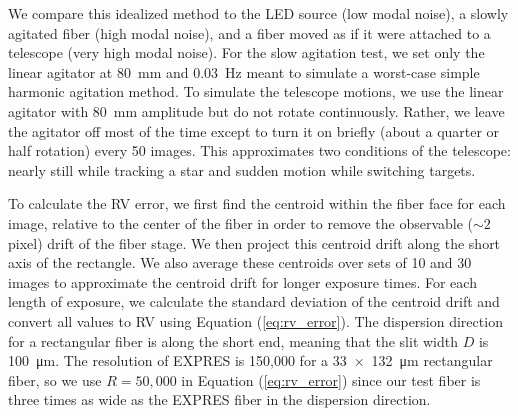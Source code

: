 \documentclass[11pt]{article}
\begin{document}
We compare this idealized method to the LED source (low modal noise), a slowly agitated fiber (high modal noise), and a fiber moved as if it were attached to a telescope (very high modal noise). For the slow agitation test, we set only the linear agitator at \SI{80}{\milli\meter} and \SI{0.03}{\hertz} meant to simulate a worst-case simple harmonic agitation method. To simulate the telescope motions, we use the linear agitator with \SI{80}{\milli\meter} amplitude but do not rotate continuously. Rather, we leave the agitator off most of the time except to turn it on briefly (about a quarter or half rotation) every 50 images. This approximates two conditions of the telescope: nearly still while tracking a star and sudden motion while switching targets.

To calculate the RV error, we first find the centroid within the fiber face for each image, relative to the center of the fiber in order to remove the observable ($\sim 2$ pixel) drift of the fiber stage. We then project this centroid drift along the short axis of the rectangle. We also average these centroids over sets of 10 and 30 images to approximate the centroid drift for longer exposure times. For each length of exposure, we calculate the standard deviation of the centroid drift and convert all values to RV using Equation (\ref{eq:rv_error}). The dispersion direction for a rectangular fiber is along the short end, meaning that the slit width $D$ is \SI{100}{\micro\meter}. The resolution of EXPRES is 150,000 for a \SI{33x132}{\micro\meter} rectangular fiber, so we use $R=50,000$ in Equation (\ref{eq:rv_error}) since our test fiber is three times as wide as the EXPRES fiber in the dispersion direction.
\end{document}
